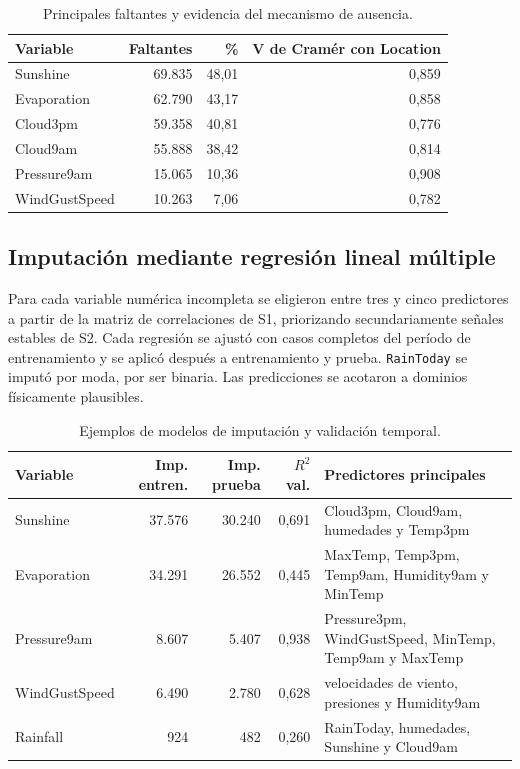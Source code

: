 \documentclass[10pt,a4paper]{article}
\newcommand{\code}[1]{\texttt{#1}}
\begin{document}
\begin{table}[H]
\centering\scriptsize
\caption{Principales faltantes y evidencia del mecanismo de ausencia.}
\begin{tabular}{lrrr}
\toprule
Variable & Faltantes & \% & V de Cramér con Location\\
\midrule
Sunshine & 69.835 & 48,01 & 0,859\\
Evaporation & 62.790 & 43,17 & 0,858\\
Cloud3pm & 59.358 & 40,81 & 0,776\\
Cloud9am & 55.888 & 38,42 & 0,814\\
Pressure9am & 15.065 & 10,36 & 0,908\\
WindGustSpeed & 10.263 & 7,06 & 0,782\\
\bottomrule
\end{tabular}
\end{table}

\subsection{Imputación mediante regresión lineal múltiple}
Para cada variable numérica incompleta se eligieron entre tres y cinco predictores a partir de la matriz de correlaciones de S1, priorizando secundariamente señales estables de S2. Cada regresión se ajustó con casos completos del período de entrenamiento y se aplicó después a entrenamiento y prueba. \code{RainToday} se imputó por moda, por ser binaria. Las predicciones se acotaron a dominios físicamente plausibles.

\begin{table}[H]
\centering\scriptsize
\caption{Ejemplos de modelos de imputación y validación temporal.}
\begin{tabularx}{\linewidth}{lrrrY}
\toprule
Variable & Imp. entren. & Imp. prueba & $R^2$ val. & Predictores principales\\
\midrule
Sunshine & 37.576 & 30.240 & 0,691 & Cloud3pm, Cloud9am, humedades y Temp3pm\\
Evaporation & 34.291 & 26.552 & 0,445 & MaxTemp, Temp3pm, Temp9am, Humidity9am y MinTemp\\
Pressure9am & 8.607 & 5.407 & 0,938 & Pressure3pm, WindGustSpeed, MinTemp, Temp9am y MaxTemp\\
WindGustSpeed & 6.490 & 2.780 & 0,628 & velocidades de viento, presiones y Humidity9am\\
Rainfall & 924 & 482 & 0,260 & RainToday, humedades, Sunshine y Cloud9am\\
\bottomrule
\end{tabularx}
\end{table}
\end{document}
